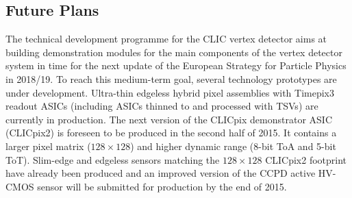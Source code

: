 \subsection{Future Plans}
The technical development programme for the CLIC vertex detector aims at building
demonstration modules for the main components of the vertex detector system
in time for the next update of the European Strategy
for Particle Physics in 2018/19. To reach this medium-term goal, several technology prototypes
are under development.
Ultra-thin edgeless hybrid pixel assemblies with Timepix3 readout ASICs (including ASICs thinned to \unit[50]{\micron}
and processed with TSVs) are currently in production.
The next version of the CLICpix demonstrator
ASIC (CLICpix2) is foreseen to be produced in the second half of 2015. It contains a larger
pixel matrix ($128\times 128$) and higher dynamic range (8-bit ToA and 5-bit ToT).
Slim-edge and edgeless sensors matching the $128\times 128$ CLICpix2 footprint have already been produced and an
improved version of the CCPD active HV-CMOS sensor will be submitted for production by the end of 2015.
